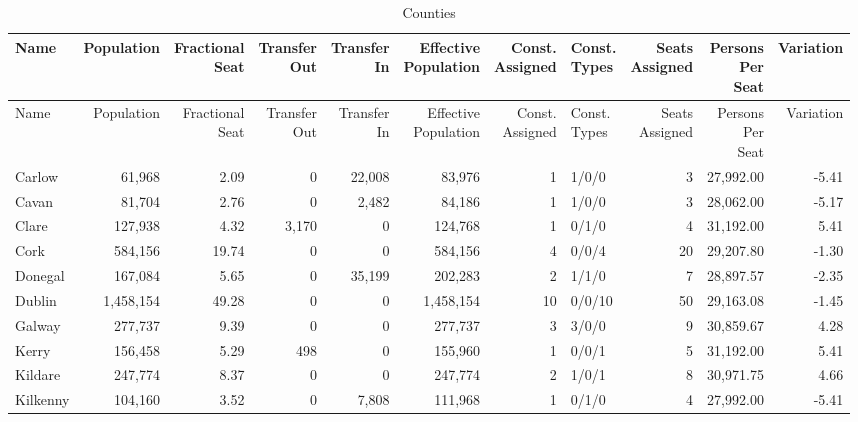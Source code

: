 \documentclass[a4paper]{article}
\begin{document}
\begin{longtable}{lrrrrrrlrrr}
\caption{Counties}
\\ \toprule
Name &Population &\shortstack{Fractional\\Seat} &\shortstack{Transfer\\Out} &\shortstack{Transfer\\In} &\shortstack{Effective\\Population} &\shortstack{Const.\\Assigned} &\shortstack{Const.\\Types} &\shortstack{Seats\\Assigned} &\shortstack{Persons\\Per\\Seat} &Variation \\ \midrule
\endfirsthead
\toprule
Name &Population &\shortstack{Fractional\\Seat} &\shortstack{Transfer\\Out} &\shortstack{Transfer\\In} &\shortstack{Effective\\Population} &\shortstack{Const.\\Assigned} &\shortstack{Const.\\Types} &\shortstack{Seats\\Assigned} &\shortstack{Persons\\Per\\Seat} &Variation \\ \midrule
\endhead
\bottomrule
\endfoot
Carlow&61,968& 2.09&0&22,008&83,976&1&1/0/0&3&27,992.00&-5.41\\ 
Cavan&81,704& 2.76&0&2,482&84,186&1&1/0/0&3&28,062.00&-5.17\\ 
Clare&127,938& 4.32&3,170&0&124,768&1&0/1/0&4&31,192.00& 5.41\\ 
Cork&584,156&19.74&0&0&584,156&4&0/0/4&20&29,207.80&-1.30\\ 
Donegal&167,084& 5.65&0&35,199&202,283&2&1/1/0&7&28,897.57&-2.35\\ 
Dublin&1,458,154&49.28&0&0&1,458,154&10&0/0/10&50&29,163.08&-1.45\\ 
Galway&277,737& 9.39&0&0&277,737&3&3/0/0&9&30,859.67& 4.28\\ 
Kerry&156,458& 5.29&498&0&155,960&1&0/0/1&5&31,192.00& 5.41\\ 
Kildare&247,774& 8.37&0&0&247,774&2&1/0/1&8&30,971.75& 4.66\\ 
Kilkenny&104,160& 3.52&0&7,808&111,968&1&0/1/0&4&27,992.00&-5.41\\ 

\end{longtable}
\end{document}
